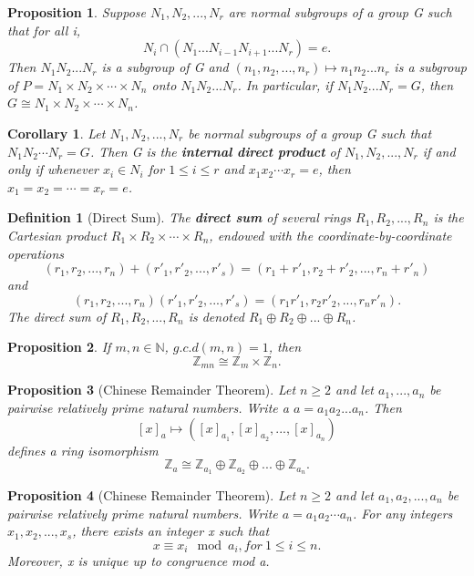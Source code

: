 \documentclass[12pt]{article}
\newtheorem{definition}{Definition}[subsection]
\newtheorem{proposition}{Proposition}[subsection]
\newtheorem{corollary}{Corollary}[subsection]
\begin{document}
    \begin{proposition}
        Suppose $N_1, N_2, ..., N_r$ are normal subgroups of a group G such that for all i,
            \[N_i \cap (N_1 ... N_{i-1}N_{i+1}...N_r) = {e}.\]
        Then $N_1N_2...N_r$ is a subgroup of G and $(n_1, n_2, ..., n_r) \mapsto n_1n_2...n_r$ is a subgroup of $P = N_1 \times N_2 \times \cdots \times N_n$ onto $N_1N_2...N_r$. In particular, if $N_1N_2...N_r = G$, then $G \cong N_1 \times N_2 \times \cdots \times N_n$.
    \end{proposition}

    \begin{corollary}
        Let $N_1, N_2, ... , N_r$ be normal subgroups of a group G such that $N_1N_2\cdots N_r = G$. Then G is the \textbf{internal direct product} of $N_1, N_2, ... , N_r$ if and only if whenever $x_i \in N_i$ for $1 \leq i \leq r$ and $x_1x_2\cdots x_r = e$, then $x_1 = x_2 = \cdots = x_r = e$.
    \end{corollary}

    \begin{definition}[Direct Sum]
        The \textbf{direct sum} of several rings $R_1, R_2, ..., R_n$ is the Cartesian product $R_1 \times R_2 \times \cdots \times R_n$, endowed with the coordinate-by-coordinate operations
            \[(r_1, r_2, ..., r_n) + (r'_1, r'_2, ..., r'_s) = (r_1 + r'_1, r_2 + r'_2, ..., r_n + r'_n)\]
            and
            \[(r_1, r_2, ..., r_n)(r'_1, r'_2, ..., r'_s) = (r_1r'_1, r_2r'_2, ..., r_nr'_n).\]
        The direct sum of $R_1, R_2, ..., R_n$ is denoted $R_1 \oplus R_2 \oplus ... \oplus R_n$.
    \end{definition}
    \begin{proposition}
    	If $m, n \in \mathbb{N}$, $g.c.d(m,n) = 1$, then \[\mathbb{Z}_{mn} \cong \mathbb{Z}_m \times \mathbb{Z}_n.\]
    \end{proposition}
    \begin{proposition}[Chinese Remainder Theorem]
        Let $n  \geq 2$ and let $a_1, ..., a_n$ be pairwise relatively prime natural numbers. Write a $a = a_1a_2...a_n$. Then
            \[ [x]_a \mapsto ([x]_{a_1}, [x]_{a_2}, ..., [x]_{a_n})\]
        defines a ring isomorphism
            \[\mathbb{Z}_a\cong \mathbb{Z}_{a_1} \oplus \mathbb{Z}_{a_2} \oplus ... \oplus \mathbb{Z}_{a_n}.\]
    \end{proposition}
    \begin{proposition}[Chinese Remainder Theorem]
        Let $n \geq 2$ and let $a_1 , a_2 , ... ,a_n$ be pairwise relatively prime natural numbers. Write $a = a_1a_2 \cdots a_n$. For any integers $x_1,x_2, ..., x_s$, there exists an integer x such that
        \[x \equiv x_i \mod a_i, for\ 1 \leq i \leq n.\]
        Moreover, x is unique up to congruence mod a.
    \end{proposition}
\end{document}
